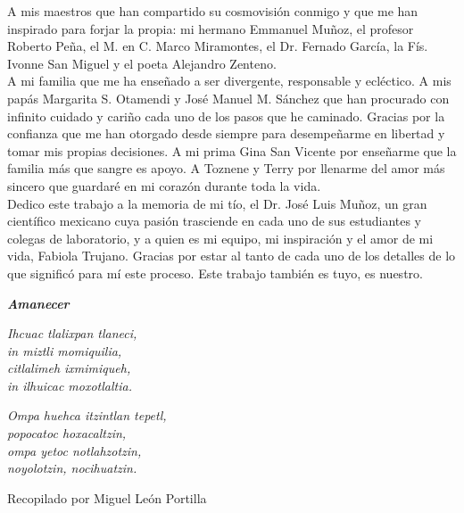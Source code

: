 \newpage

A mis maestros que han compartido su cosmovisión conmigo y que me han inspirado para forjar la propia: mi hermano Emmanuel Muñoz, el profesor Roberto Peña, el M. en C. Marco Miramontes, el Dr. Fernado García, la Fís. Ivonne San Miguel y el poeta Alejandro Zenteno.\\

A mi familia que me ha enseñado a ser divergente, responsable y ecléctico. A mis papás Margarita S. Otamendi y José Manuel M. Sánchez que han procurado con infinito cuidado y cariño cada uno de los pasos que he caminado. Gracias por la confianza que me han otorgado desde siempre para desempeñarme en libertad y tomar mis propias decisiones. A mi prima Gina San Vicente por enseñarme que la familia más que sangre es apoyo. A Toznene y Terry por llenarme del amor más sincero que guardaré en mi corazón durante toda la vida.\\

Dedico este trabajo a la memoria de mi tío, el Dr. José Luis Muñoz, un gran científico mexicano cuya pasión trasciende en cada uno de sus estudiantes y colegas de laboratorio, y a  quien es mi equipo, mi inspiración y el amor de mi vida, Fabiola Trujano. Gracias por estar al tanto de cada uno de los detalles de lo que significó para mí este proceso. Este trabajo también es tuyo, es nuestro.\\

\vspace{15mm} 

\begin{center}

\textbf{\textit{Amanecer}}\\
\vspace{2mm} 


\textit{Ihcuac tlalixpan tlaneci,}\\
\textit{in miztli momiquilia,}\\
\textit{citlalimeh ixmimiqueh,}\\
\textit{in ilhuicac moxotlaltia.}\\

\vspace{2mm} 

\textit{Ompa huehca itzintlan tepetl,}\\
\textit{popocatoc hoxacaltzin,}\\
\textit{ompa yetoc notlahzotzin,}\\
\textit{noyolotzin, nocihuatzin.}\\

\vspace{2mm}

Recopilado por Miguel León Portilla 

\end{center}